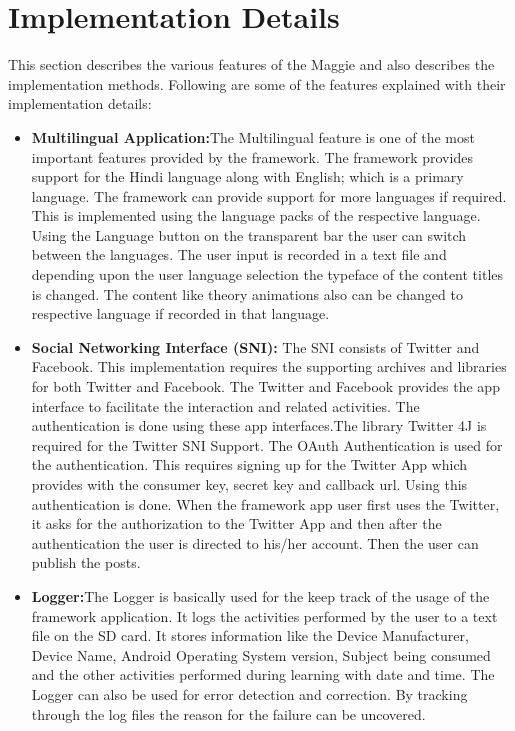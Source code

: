 \documentclass[openany,12pt]{report}
\begin{document}
\section{Implementation Details}
\hspace*{0.5in}This section describes the various features of the Maggie and also describes the implementation methods. Following are some of the features explained with their implementation details:\\
\begin{itemize}

\item{\textbf{Multilingual Application:}}The Multilingual feature is one of the most important features provided by the framework. The framework provides support for the Hindi language along with English; which is a primary language. The framework can provide support for more languages if required. This is implemented using the language packs of the respective language. Using the Language button on the transparent bar the user can switch between the languages. The user input is recorded in a text file and depending upon the user language selection the typeface of the content titles is changed. The content like theory animations also can be changed to respective language if recorded in that language.

\item{\textbf{Social Networking Interface (SNI):}} The SNI consists of Twitter and Facebook. This implementation requires the supporting archives and libraries for both Twitter and Facebook. The Twitter and Facebook provides the app interface to facilitate the interaction and related activities. The authentication is done using these app interfaces.The library Twitter 4J is required for the Twitter SNI Support. The OAuth Authentication is used for the authentication. This requires signing up for the Twitter App which provides with the consumer key, secret key and callback url. Using this authentication is done. When the framework app user first uses the Twitter, it asks for the authorization to the Twitter App and then after the authentication the user is directed to his/her account. Then the user can publish the posts. 

\item{\textbf{Logger:}}The Logger is basically used for the keep track of the usage of the framework application. It logs the activities performed by the user to a text file on the SD card. It stores information like the Device Manufacturer, Device Name, Android Operating System version, Subject being consumed and the other activities performed during learning with date and time. The Logger can also be used for error detection and correction. By tracking through the log files the reason for the failure can be uncovered.


\end{itemize}
\end{document}
